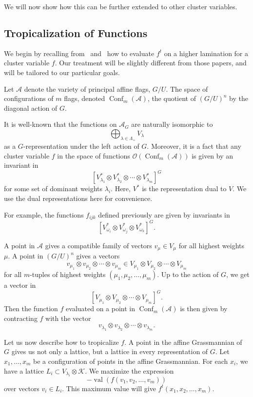 \documentclass[ALCO,ThmDefs,Unicode,epreuves]{cedram}
\newcommand{\A}{\mathcal{A}}
\newcommand{\val}{\operatorname{val}}
\newcommand{\Conf}{\operatorname{Conf}}
\begin{document}
We will now show how this can be further extended to other cluster variables.

\subsection{Tropicalization of Functions}

We begin by recalling from~\cite{GS} and~\cite{Le} how to evaluate $f^t$ on a higher lamination for a cluster variable $f$. Our treatment will be slightly different from those papers, and will be tailored to our particular goals.

Let $\A$ denote the variety of principal affine flags, $G/U$. The space of configurations of $m$ flags, denoted $\Conf_m (\A)$, the quotient of $(G/U)^n$ by the diagonal action of $G$. 

It is well-known that the functions on $\A_G$ are naturally isomorphic to 
\[
\bigoplus_{\lambda \in \Lambda_+} V_{\lambda}
\]
as a $G$-representation under the left action of $G$. Moreover, it is a fact that any cluster variable $f$ in the space of functions $\mathcal{O}(\Conf_m (\A))$ is given by an invariant in
\[
[V_{\lambda_1}^* \otimes V_{\lambda_2}^* \otimes \cdots \otimes V_{\lambda_m}^*]^G
\]
for some set of dominant weights $\lambda_i$. Here, $V^*$ is the representation dual to $V$. We use the dual representations here for convenience.

For example, the functions $f_{ijk}$ defined previously are given by invariants in 
\[
[V_{\omega_i}^* \otimes V_{\omega_j}^* \otimes V_{\omega_k}^*]^G.
\]

A point in $\A$ gives a compatible family of vectors $v_{\mu} \in V_{\mu}$ for all highest weights $\mu$. A point in $(G/U)^n$ gives a vectors 
\[
v_{\mu_1} \otimes v_{\mu_2} \otimes \cdots \otimes v_{\mu_m} \in V_{\mu_1} \otimes V_{\mu_2} \otimes \cdots \otimes V_{\mu_m}
\]
for all $m$-tuples of highest weights $(\mu_1, \mu_2, \dots, \mu_m)$. Up to the action of $G$, we get a vector in
\[
[V_{\mu_1} \otimes V_{\mu_2} \otimes \cdots \otimes V_{\mu_m}]^G.
\]
Then the function $f$ evaluated on a point in $\Conf_m (\A)$ is then given by contracting $f$ with the vector 
\[
v_{\lambda_1} \otimes v_{\lambda_2} \otimes \cdots \otimes v_{\lambda_m}.
\]

Let us now describe how to tropicalize $f$. 
A point in the affine Grassmannian of $G$ gives us not only a lattice, but a lattice in every representation of $G$. Let $x_1, \dots, x_m$ be a configuration of points in the affine Grassmannian. For each $x_i$, we have a lattice $L_i \subset V_{\lambda_i} \otimes \mathcal{K}$. We maximize the expression
\[
-\val(f(v_1, v_2, \dots, v_m))
\]
over vectors $v_i \in L_i$. This maximum value will give $f^t(x_1, x_2, \dots, x_m)$.
\end{document}
